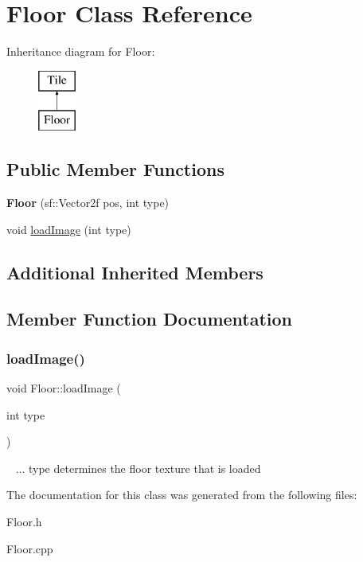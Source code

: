 \hypertarget{class_floor}{}\section{Floor Class Reference}
\label{class_floor}
Inheritance diagram for Floor\+:\begin{figure}[H]
\begin{center}
\leavevmode
\includegraphics[height=2.000000cm]{class_floor}
\end{center}
\end{figure}
\subsection*{Public Member Functions}
\begin{DoxyCompactItemize}
\item 
\mbox{\label{class_floor_a2a2c2380294e13ca8d9ba0b133ad4d80}} 
{\bfseries Floor} (sf\+::\+Vector2f pos, int type)
\item 
void \mbox{\hyperlink{class_floor_acbd296ad6187a5f1cbff67a58b525054}{load\+Image}} (int type)
\end{DoxyCompactItemize}
\subsection*{Additional Inherited Members}


\subsection{Member Function Documentation}
\mbox{\label{class_floor_acbd296ad6187a5f1cbff67a58b525054}} 
\subsubsection{\texorpdfstring{load\+Image()}{loadImage()}}
{\footnotesize\ttfamily void Floor\+::load\+Image (\begin{DoxyParamCaption}\item[{int}]{type }\end{DoxyParamCaption})}

~\newline
... type determines the floor texture that is loaded

The documentation for this class was generated from the following files\+:\begin{DoxyCompactItemize}
\item 
Floor.\+h\item 
Floor.\+cpp\end{DoxyCompactItemize}
